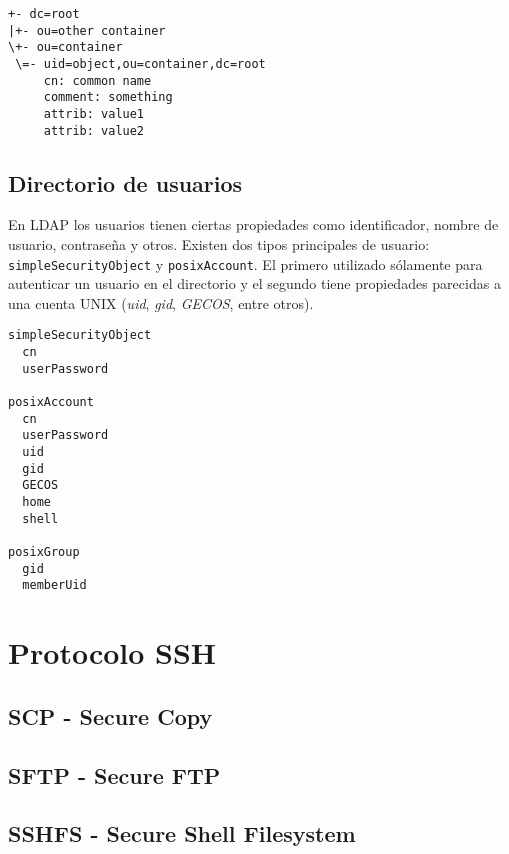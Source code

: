 
{
\scriptsize
\linespread{1}
\begin{verbatim}
+- dc=root
|+- ou=other container
\+- ou=container
 \=- uid=object,ou=container,dc=root
     cn: common name
     comment: something
     attrib: value1
     attrib: value2
\end{verbatim}
}

  \subsection {Directorio de usuarios}

En LDAP  los usuarios tienen ciertas propiedades como identificador, nombre de usuario, contrase\~{n}a y otros. Existen dos tipos principales de usuario: \verb/simpleSecurityObject/ y \verb/posixAccount/. El primero utilizado s\'{o}lamente para autenticar un usuario en el directorio y el segundo tiene propiedades parecidas a una cuenta UNIX (\textit{uid}, \textit{gid}, \textit{GECOS}, entre otros).

{
\scriptsize
\linespread{1}
\begin{verbatim}
simpleSecurityObject
  cn
  userPassword

posixAccount
  cn
  userPassword
  uid
  gid
  GECOS
  home
  shell

posixGroup
  gid
  memberUid
\end{verbatim}
}

\section {Protocolo SSH}

  \subsection {SCP - Secure Copy}
  \subsection {SFTP - Secure FTP}
  \subsection {SSHFS - Secure Shell Filesystem}

